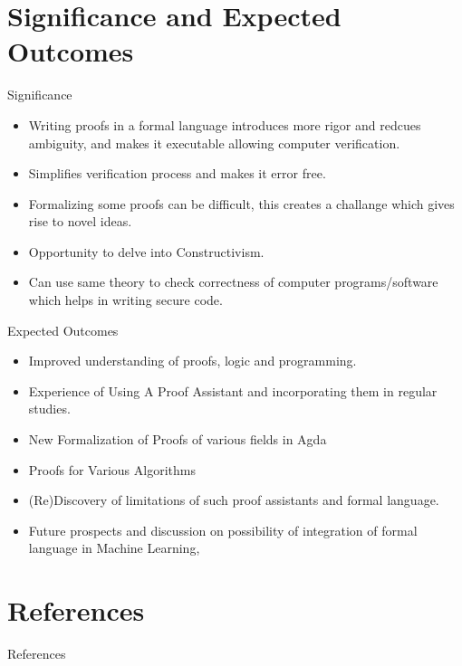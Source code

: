 \documentclass{beamer}
\begin{document}
\section{Significance and Expected Outcomes}
\begin{frame}{Significance}
  \begin{itemize}
    \item Writing proofs in a formal language introduces more rigor and redcues ambiguity, and makes it executable allowing computer verification.
    \item Simplifies verification process and makes it error free.
     \item Formalizing some proofs can be difficult, this creates a challange which gives rise to novel ideas.
    \item Opportunity to delve into Constructivism.
    \item Can use same theory to check correctness of computer programs/software which helps in writing secure code. 
  \end{itemize}

\end{frame}
\begin{frame}{Expected Outcomes}
  \begin{itemize}
    \item Improved understanding of proofs, logic and programming.
    \item Experience of Using A Proof Assistant and incorporating them in regular studies.
    \item New Formalization of Proofs of various fields in Agda 
    \item Proofs for Various Algorithms
    \item (Re)Discovery of limitations of such proof assistants and formal language.
    \item Future prospects and discussion on possibility of integration of formal language in Machine Learning,
  \end{itemize}
\end{frame}

\section{References}
\begin{frame}{References}
       
 
\end{frame}

       
\end{document}
